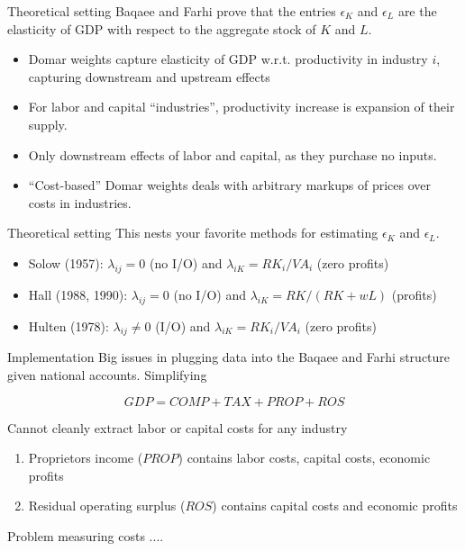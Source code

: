 \documentclass[10pt,xcolor=dvipsnames]{beamer}
\begin{document}
\begin{frame}{Theoretical setting}
Baqaee and Farhi prove that the entries $\epsilon_K$ and $\epsilon_L$ are the elasticity of GDP with respect to the aggregate stock of $K$ and $L$. 

\begin{itemize}
  \item Domar weights capture elasticity of GDP w.r.t. productivity in industry $i$, capturing downstream and upstream effects
  \item For labor and capital ``industries'', productivity increase is expansion of their supply.
  \item Only downstream effects of labor and capital, as they purchase no inputs.
  \item ``Cost-based'' Domar weights deals with arbitrary markups of prices over costs in industries. 
\end{itemize}

\end{frame}

\begin{frame}{Theoretical setting}
This nests your favorite methods for estimating $\epsilon_K$ and $\epsilon_L$.
\vspace{.25in}

\begin{itemize}
  \item Solow (1957): $\lambda_{ij} = 0$ (no I/O) and $\lambda_{iK} = RK_i/VA_i$ (zero profits)
  \item Hall (1988, 1990): $\lambda_{ij} = 0$ (no I/O) and $\lambda_{iK} = RK/(RK+wL)$ (profits)
  \item Hulten (1978): $\lambda_{ij} \neq 0$ (I/O) and $\lambda_{iK} = RK_i/VA_i$ (zero profits)
\end{itemize}

\end{frame}


\begin{frame}{Implementation}
Big issues in plugging data into the Baqaee and Farhi structure given national accounts. Simplifying

\begin{equation}
  GDP = COMP + TAX + PROP + ROS
\end{equation}

Cannot cleanly extract labor or capital costs for any industry
\begin{enumerate}
  \item Proprietors income ($PROP$) contains labor costs, capital costs, economic profits
  \item Residual operating surplus ($ROS$) contains capital costs and economic profits
\end{enumerate}

Problem measuring costs ....

\end{frame}
\end{document}
